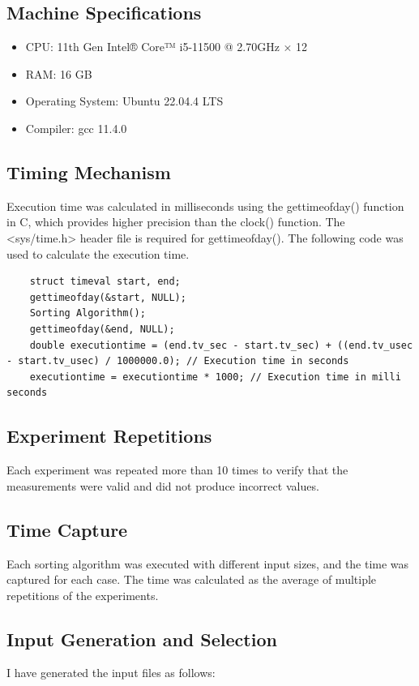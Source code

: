 \documentclass[a4paper,12pt]{report}
\begin{document}
\newpage
\subsection{Machine Specifications}
\begin{itemize}
  \item CPU: 11th Gen Intel® Core™ i5-11500 @ 2.70GHz × 12
  \item RAM: 16 GB
  \item Operating System: Ubuntu 22.04.4 LTS
  \item Compiler: gcc 11.4.0
\end{itemize}

\subsection{Timing Mechanism}
Execution time was calculated in milliseconds using the gettimeofday() function in C, which provides higher precision than the clock() function. The <sys/time.h> header file is required for gettimeofday(). The following code was used to calculate the execution time.
\begin{lstlisting}
    struct timeval start, end;
    gettimeofday(&start, NULL);
    Sorting Algorithm();
    gettimeofday(&end, NULL);
    double executiontime = (end.tv_sec - start.tv_sec) + ((end.tv_usec - start.tv_usec) / 1000000.0); // Execution time in seconds
    executiontime = executiontime * 1000; // Execution time in milli seconds
\end{lstlisting}

\subsection{Experiment Repetitions}
Each experiment was repeated more than 10 times to verify that the measurements were valid and did not produce incorrect values.

\subsection{Time Capture}
Each sorting algorithm was executed with different input sizes, and the time was captured for each case. The time was calculated as the average of multiple repetitions of the experiments. 

\subsection{Input Generation and Selection}
I have generated the input files as follows:
\end{document}
